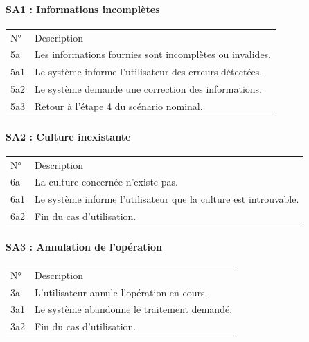 \documentclass[
]{article}
\begin{document}
\hypertarget{sa1-informations-incompluxe8tes}{%
\paragraph{SA1 : Informations
incomplètes}\label{sa1-informations-incompluxe8tes}}

\begin{longtable}[]{@{}ll@{}}
\toprule
\endhead
N° & Description \\
5a & Les informations fournies sont incomplètes ou invalides. \\
5a1 & Le système informe l'utilisateur des erreurs détectées. \\
5a2 & Le système demande une correction des informations. \\
5a3 & Retour à l'étape 4 du scénario nominal. \\
\bottomrule
\end{longtable}

\hypertarget{sa2-culture-inexistante}{%
\paragraph{SA2 : Culture inexistante}\label{sa2-culture-inexistante}}

\begin{longtable}[]{@{}ll@{}}
\toprule
\endhead
N° & Description \\
6a & La culture concernée n'existe pas. \\
6a1 & Le système informe l'utilisateur que la culture est
introuvable. \\
6a2 & Fin du cas d'utilisation. \\
\bottomrule
\end{longtable}

\hypertarget{sa3-annulation-de-lopuxe9ration}{%
\paragraph{SA3 : Annulation de
l'opération}\label{sa3-annulation-de-lopuxe9ration}}

\begin{longtable}[]{@{}ll@{}}
\toprule
\endhead
N° & Description \\
3a & L'utilisateur annule l'opération en cours. \\
3a1 & Le système abandonne le traitement demandé. \\
3a2 & Fin du cas d'utilisation. \\
\bottomrule
\end{longtable}
\end{document}

